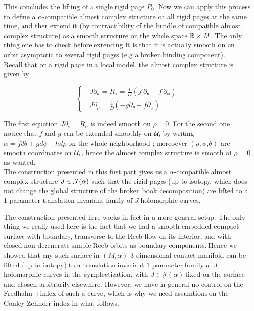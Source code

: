 \documentclass[../main.tex]{subfiles}
\begin{document}
This concludes the lifting of a single rigid page $P_0$. Now we can apply this process to define a $\alpha$-compatible almost complex structure on all rigid pages at the same time, and then extend it (by contractibility of the bundle of compatible almost complex structure) as a smooth structure on the whole space $\mathbb{R}\times M$. The only thing one has to check before extending it is that it is actually smooth on an orbit asymptotic to several rigid pages (e.g a broken binding component). \\

Recall that on a rigid page in a local model, the almost complex structure is given by 

$$\left\{
    \begin{array}{ll}
        & J\partial_a = R_\alpha= \frac{1}{D}(g'\partial_\theta - f'\partial_\phi) \\
        & J\partial_\rho = \frac{1}{D}(-g\partial_\theta + f\partial_\phi) 
    \end{array}
\right.$$

The first equation $J\partial_a = R_\alpha$ is indeed smooth on $\rho = 0$. For the second one, notice that $f$ and $g$ can be extended smoothly on $\mathcal{U}_i$ by writing $\alpha = fd\theta + gd\phi + hd\rho$ on the whole neighborhood ; moreoever $(\rho,\phi,\theta)$ are smooth coordinates on $\mathcal{U}_i$, hence the almost complex structure is smooth at $\rho = 0$ as wanted. \\

The construction presented in this first part gives us a $\alpha$-compatible almost complex structure $J\in\mathcal{J}(\alpha)$ such that the rigid pages (up to isotopy, which does not change the global structure of the broken book decomposition) are lifted to a 1-parameter translation invariant family of $J$-holomorphic curves. 


\begin{remark}
    The construction presented here works in fact in a more general setup. The only thing we really used here is the fact that we had a smooth embedded compact surface with boundary, transverse to the Reeb flow on its interior, and with closed non-degenerate simple Reeb orbits as boundary components. Hence we showed that any such surface in $(M,\alpha)$ 3-dimensional contact manifold can be lifted (up to isotopy) to a translation invariant $1$-parameter family of $J$-holomorphic curves in the symplectization, with $J\in\mathcal{J}(\alpha)$ fixed on the surface and chosen arbitrarily elsewhere. However, we have in general no control on the Fredholm +index of such a curve, which is why we need assumtions on the Conley-Zehnder index in what follows.\\
\end{remark}
\end{document}
